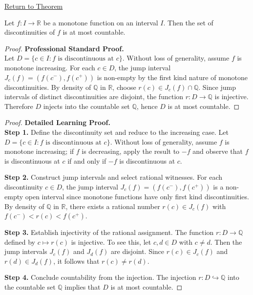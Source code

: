 \newpage
{}
\label{prf:monotone-discontinuities-countable}

\begin{remark*}[Return]
\hyperref[thm:monotone-discontinuities-countable]{Return to Theorem}
\end{remark*}

\begin{theorem*}
Let $f : I \to \mathbb{R}$ be a monotone function on an interval $I$. Then the set of discontinuities of $f$ is at most countable.
\end{theorem*}

\begin{proof}
\textbf{Professional Standard Proof.}~\\
Let $D = \{c \in I : f \text{ is discontinuous at } c\}$. Without loss of generality, assume $f$ is monotone increasing. For each $c \in D$, the jump interval $J_c(f) = (f(c^{-}), f(c^{+}))$ is non-empty by the first kind nature of monotone discontinuities. By density of $\mathbb{Q}$ in $\mathbb{R}$, choose $r(c) \in J_c(f) \cap \mathbb{Q}$. Since jump intervals of distinct discontinuities are disjoint, the function $r : D \to \mathbb{Q}$ is injective. Therefore $D$ injects into the countable set $\mathbb{Q}$, hence $D$ is at most countable.
\end{proof}

\begin{proof}
\textbf{Detailed Learning Proof.}~\\

\textbf{Step 1.} Define the discontinuity set and reduce to the increasing case. Let $D = \{c \in I : f \text{ is discontinuous at } c\}$. Without loss of generality, assume $f$ is monotone increasing; if $f$ is decreasing, apply the result to $-f$ and observe that $f$ is discontinuous at $c$ if and only if $-f$ is discontinuous at $c$.

\textbf{Step 2.} Construct jump intervals and select rational witnesses. For each discontinuity $c \in D$, the jump interval $J_c(f) = (f(c^{-}), f(c^{+}))$ is a non-empty open interval since monotone functions have only first kind discontinuities. By density of $\mathbb{Q}$ in $\mathbb{R}$, there exists a rational number $r(c) \in J_c(f)$ with $f(c^{-}) < r(c) < f(c^{+})$.

\textbf{Step 3.} Establish injectivity of the rational assignment. The function $r : D \to \mathbb{Q}$ defined by $c \mapsto r(c)$ is injective. To see this, let $c, d \in D$ with $c \neq d$. Then the jump intervals $J_c(f)$ and $J_d(f)$ are disjoint. Since $r(c) \in J_c(f)$ and $r(d) \in J_d(f)$, it follows that $r(c) \neq r(d)$.

\textbf{Step 4.} Conclude countability from the injection. The injection $r : D \hookrightarrow \mathbb{Q}$ into the countable set $\mathbb{Q}$ implies that $D$ is at most countable.
\end{proof}

